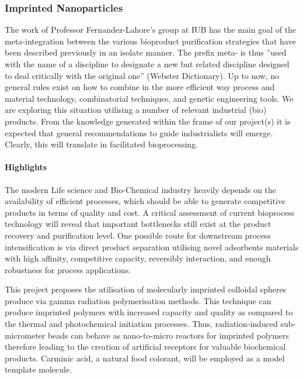 \subsubsection{Imprinted Nanoparticles}

The work of Professor Fernandez-Lahore's group at IUB has the main
goal of the meta-integration between the various bioproduct
purification strategies that have been described
 previously in an isolate manner. The prefix meta- is thus
 ''used with the name of a discipline to designate a new but
  related discipline designed to deal critically with the original
  one''  (Webster Dictionary). Up to now, no general rules exist on how to
   combine in the more efficient way process and material technology,
combinatorial techniques, and genetic engineering tools. We are
exploring this situation utilising a number of relevant industrial
(bio) products. From the knowledge generated within the frame of
our project(s) it is expected that general recommendations to
guide industrialists will emerge. Clearly, this will translate in
facilitated bioprocessing.



\paragraph{Highlights}
%
The modern Life science and Bio-Chemical industry heavily depends
on the availability of efficient processes, which should be able
to generate competitive products in terms of quality and cost. A
critical assessment of current bioprocess technology will reveal
that important bottlenecks still exist at the product recovery and
purification level. One possible route for downstream process
intensification is via direct product separation utilising novel
adsorbents materials with high affinity, competitive capacity,
reversibly interaction, and enough robustness for process
applications.

This project proposes the utilisation of molecularly imprinted
colloidal spheres produce via gamma radiation polymerisation
methods. This technique can produce imprinted polymers with
increased capacity and quality as compared to the thermal and
photochemical initiation processes. Thus, radiation-induced
sub-micrometer beads can behave as nano-to-micro reactors for
imprinted polymers therefore leading to the creation of artificial
receptors for valuable biochemical products. Carminic acid, a
natural food colorant, will be employed as a model template
molecule.

